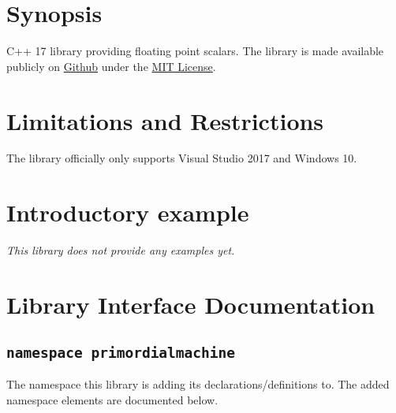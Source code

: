 \documentclass[oneside]{book}
\begin{document}
\frontmatter

\begin{titlepage}
\maketitle
\end{titlepage}

\tableofcontents
{}

\mainmatter

\chapter{Synopsis}
C++ 17 library providing floating point scalars.
The library is made available publicly on
\href{\GetLibraryRepository}{Github}
under the
\href{\GetLibraryRepository/blob/master/LICENSE}{MIT License}.

\chapter{Limitations and Restrictions}
The library officially only supports Visual Studio 2017 and Windows 10.

\chapter{Introductory example}
\textit{\color{orange}This library does not provide any examples yet.}



\chapter{Library Interface Documentation}

\section{\texttt{namespace primordialmachine}}
The namespace this library is adding its declarations/definitions to.
The added namespace elements are documented below.
\end{document}
